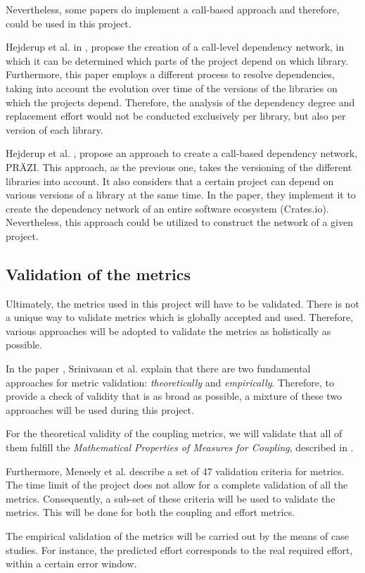 \bigskip\noindent
Nevertheless, some papers do implement a call-based approach and therefore, could be used in this project.

Hejderup et al. in \cite{hejderup2018software}, propose the creation of a call-level dependency network, in which it can be determined which parts of the project depend on which library. Furthermore, this paper employs a different process to resolve dependencies, taking into account the evolution over time of the versions of the libraries on which the projects depend. Therefore, the analysis of the dependency degree and replacement effort would not be conducted exclusively per library, but also per version of each library.

 Hejderup et al. \cite{hejderup2018prazi}, propose an approach to create a call-based dependency network, PRÄZI. This approach, as the previous one, takes the versioning of the different libraries into account. It also considers that a certain project can depend on various versions of a library at the same time. In the paper, they implement it to create the dependency network of an entire software ecosystem (Crates.io). Nevertheless, this approach could be utilized to construct the network of a given project.

\subsection{Validation of the metrics}
Ultimately, the metrics used in this project will have to be validated. There is not a unique way to validate metrics which is globally accepted and used. Therefore, various approaches will be adopted to validate the metrics as holistically as possible.

In the paper \cite{srinivasan2014software}, Srinivasan et al. explain that there are two fundamental approaches for metric validation: \textit{theoretically} and \textit{empirically}. Therefore, to provide a check of validity that is as broad as possible, a mixture of these two approaches will be used during this project.

For the theoretical validity of the coupling metrics, we will validate that all of them fulfill the \textit{Mathematical Properties of Measures for Coupling}, described in \cite{srinivasan2014software}.

Furthermore, Meneely et al. \cite{meneely2013validating} describe a set of 47 validation criteria for metrics. The time limit of the project does not allow for a complete validation of all the metrics. Consequently, a sub-set of these criteria will be used to validate the metrics. This will be done for both the coupling and effort metrics.

The empirical validation of the metrics will be carried out by the means of case studies. For instance, the predicted effort corresponds to the real required effort, within a certain error window.
